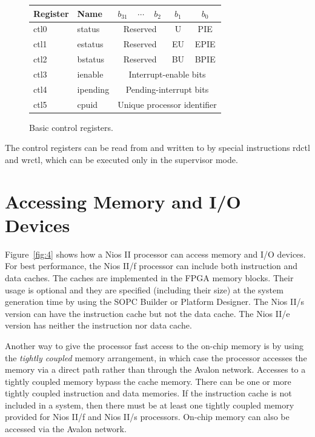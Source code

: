 \documentclass[11pt, twoside, pdftex]{article}
\begin{document}
\begin{figure}[H]
\begin{center}
\begin{tabular}{|l|l|lll|c|c|} \hline 
\rule{0in}{0.1in}{\bf Register} & {\bf Name} & $b_{31}$ & $\cdots$ & $b_2$ & $b_1$ & $b_0$ \\ \hline
ctl0 & status & \multicolumn{3}{|c|}{Reserved} & U & PIE \\ 
ctl1 & estatus & \multicolumn{3}{|c|}{Reserved} & EU & EPIE \\ 
ctl2 & bstatus & \multicolumn{3}{|c|}{Reserved} & BU & BPIE \\ \hline
ctl3 & ienable & \multicolumn{5}{|c|}{Interrupt-enable bits} \\
ctl4 & ipending & \multicolumn{5}{|c|}{Pending-interrupt bits} \\
ctl5 & cpuid & \multicolumn{5}{|c|}{Unique processor identifier} \\ \hline
\end{tabular}
\end{center}
	\caption{Basic control registers.}
	\label{fig:3}
\end{figure}

\noindent
The control registers can be read from and written to by special instructions
{\sf rdctl} and {\sf wrctl}, which can be executed only in the supervisor mode.

\section{Accessing Memory and I/O Devices}

Figure~\ref{fig:4} shows how a Nios II processor can access memory and I/O devices.
For best performance, the Nios II/f processor can include both instruction and 
data caches. The caches are implemented in the FPGA memory blocks. Their usage is
optional and they are specified (including their size) at the
system generation time by using the SOPC Builder or Platform Designer. The Nios II/s version can have
the instruction cache but not the data cache. The Nios II/e version has neither the
instruction nor data cache.

Another way to give the processor fast access to the on-chip memory is by using the 
{\it tightly coupled} memory arrangement, in which case the processor accesses the
memory via a direct path rather than through the Avalon network. Accesses to a tightly
coupled memory bypass the cache memory.
There can be one or more tightly coupled instruction and data memories.
If the instruction cache is not included in a system, then there must be at least
one tightly coupled memory provided for Nios II/f and Nios II/s processors.
On-chip memory can also be accessed via the Avalon network.
\end{document}
